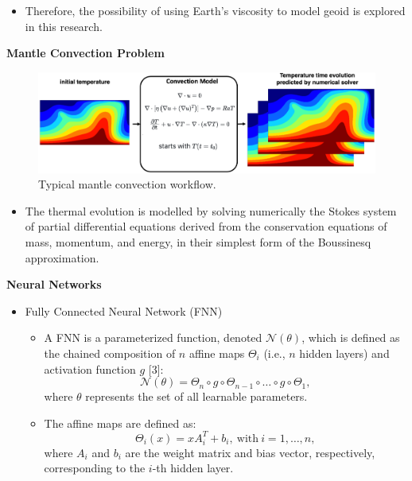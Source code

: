 {\begin{itemize}
     \item Therefore, the possibility of using Earth's viscosity to model geoid is explored in this research.
\end{itemize}

\textbf{Mantle Convection Problem}

\begin{figure}[H]
    \includegraphics[width=\linewidth]{figures/Mantle_Convection_workflow.png}
    \caption{Typical mantle convection workflow.}
\end{figure}

\begin{itemize}
    \item The thermal evolution is modelled by solving numerically the Stokes system of partial differential equations derived from the conservation equations of mass, momentum, and energy, in their simplest form of the Boussinesq approximation. 
\end{itemize}

\textbf{Neural Networks}
\begin{itemize}
    \item Fully Connected Neural Network (FNN)
            \begin{itemize} 
                \item A FNN is a parameterized function, denoted $\mathcal{N}(\theta)$, which is defined as the chained composition of $n$ affine maps $\Theta_i$ (i.e., $n$ hidden layers) and activation function $g$ [3]:
            \begin{equation*}
            \mathcal{N}(\theta) = \Theta_n \circ g \circ \Theta_{n-1} \circ \ldots \circ g \circ \Theta_1,
            \end{equation*}
            where $\theta$ represents the set of all learnable parameters.
               \item The affine maps are defined as:
            \begin{equation*} \Theta_i(x) = xA_i^{T} + b_i, \ \mathrm{with} \ i=1,\ldots,n, \end{equation*}
            where $A_i$ and $b_i$ are the weight matrix and bias vector, respectively, corresponding to the $i$-th hidden layer.
        \end{itemize}


\end{itemize}}
